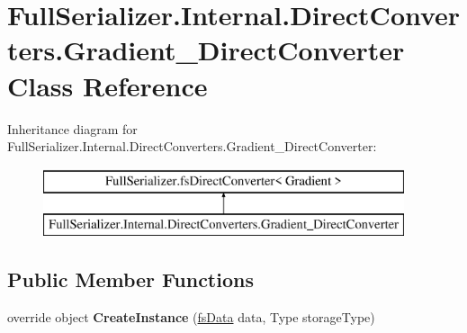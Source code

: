 \hypertarget{class_full_serializer_1_1_internal_1_1_direct_converters_1_1_gradient___direct_converter}{}\section{Full\+Serializer.\+Internal.\+Direct\+Converters.\+Gradient\+\_\+\+Direct\+Converter Class Reference}
\label{class_full_serializer_1_1_internal_1_1_direct_converters_1_1_gradient___direct_converter}
Inheritance diagram for Full\+Serializer.\+Internal.\+Direct\+Converters.\+Gradient\+\_\+\+Direct\+Converter\+:\begin{figure}[H]
\begin{center}
\leavevmode
\includegraphics[height=2.000000cm]{class_full_serializer_1_1_internal_1_1_direct_converters_1_1_gradient___direct_converter}
\end{center}
\end{figure}
\subsection*{Public Member Functions}
\begin{DoxyCompactItemize}
\item 
\mbox{\label{class_full_serializer_1_1_internal_1_1_direct_converters_1_1_gradient___direct_converter_ab258e764b6b9ca08f1b0d38de248b7e1}} 
override object {\bfseries Create\+Instance} (\hyperlink{class_full_serializer_1_1fs_data}{fs\+Data} data, Type storage\+Type)
\end{DoxyCompactItemize}
